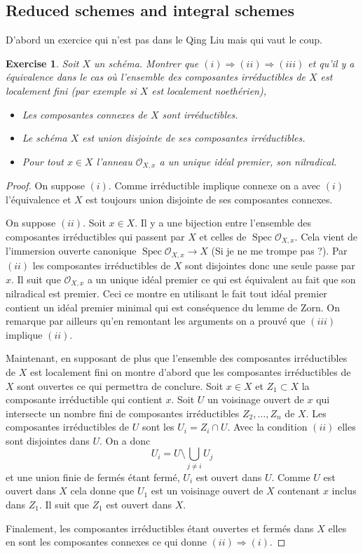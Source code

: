 \documentclass[A4, 11pt]{article}
\newtheorem{exer}{Exercise}
\def\Spec{ \operatorname{Spec}}
\begin{document}
\subsection{Reduced schemes and integral schemes}
D'abord un exercice qui n'est pas dans le Qing Liu mais qui vaut le coup.
\begin{exer} Soit $X$ un schéma. Montrer que $(i)\Rightarrow (ii)\Rightarrow (iii)$ et qu'il y a équivalence dans le cas où l'ensemble des composantes irréductibles de $X$ est localement fini (par exemple si $X$ est localement noethérien),
\begin{itemize}
\item[(i)] Les composantes connexes de $X$ sont irréductibles.
\item[(ii)] Le schéma $X$ est union disjointe de ses composantes irréductibles.
\item[(iii)] Pour tout $x\in X$ l'anneau $\mathcal{O}_{X,x}$ a un unique idéal premier, son nilradical.
\end{itemize}
\end{exer}
\begin{proof}
On suppose $(i)$. Comme irréductible implique connexe on a avec $(i)$ l'équivalence et $X$ est toujours union disjointe de ses composantes connexes. 

On suppose $(ii)$. Soit $x\in X$. Il y a une bijection entre l'ensemble des composantes irréductibles qui passent par $X$ et celles de $\Spec \mathcal{O}_{X,x}$. Cela vient de l'immersion ouverte canonique $\Spec \mathcal{O}_{X,x} \rightarrow X$ (Si je ne me trompe pas ?). Par $(ii)$ les composantes irréductibles de $X$ sont disjointes donc une seule passe par $x$. Il suit que $\mathcal{O}_{X,x}$ a un unique idéal premier ce qui est équivalent au fait que son nilradical est premier. Ceci ce montre en utilisant le fait tout idéal premier contient un idéal premier minimal qui est conséquence du lemme de Zorn. On remarque par ailleurs qu'en remontant les arguments on a prouvé que $(iii)$ implique $(ii)$.

Maintenant, en supposant de plus que l'ensemble des composantes irréductibles de $X$ est localement fini on montre d'abord que les composantes irréductibles de $X$ sont ouvertes ce qui permettra de conclure. Soit $x\in X$ et $Z_1\subset X$ la composante irréductible qui contient $x$. Soit $U$ un voisinage ouvert de $x$ qui intersecte un nombre fini de composantes irréductibles $Z_2,\dots, Z_n$ de $X$. Les composantes irréductibles de $U$ sont les $U_i=Z_i\cap U$. Avec la condition $(ii)$ elles sont disjointes dans $U$. On a donc
$$U_i=U\setminus \bigcup\limits_{j\neq i} U_j$$
et une union finie de fermés étant fermé, $U_i$ est ouvert dans $U$. Comme $U$ est ouvert dans $X$ cela donne que $U_1$ est un voisinage ouvert de $X$ contenant $x$ inclus dans $Z_1$. Il suit que $Z_1$ est ouvert dans $X$. 

Finalement, les composantes irréductibles étant ouvertes et fermés dans $X$ elles en sont les composantes connexes ce qui donne $(ii)\Rightarrow (i)$. 
\end{proof}
\end{document}
